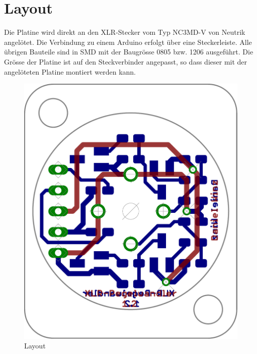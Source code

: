 
\section{Layout}
Die Platine wird direkt an den XLR-Stecker vom Typ NC3MD-V von Neutrik 
angelötet. Die Verbindung zu einem Arduino erfolgt über eine Steckerleiste. 
Alle übrigen Bauteile sind in SMD mit der Baugrösse 0805 bzw. 1206 ausgeführt. 
Die Grösse der Platine ist auf den Steckverbinder angepasst, so dass dieser 
mit der angelöteten Platine montiert werden kann. 
\begin{figure}[h!]
	\centering
	\includegraphics[scale=\layscale]{fig/xlr_pegelwandler_v_1_2_lay_transp.pdf}
	\caption{Layout}
	\label{lay:pegw}
\end{figure}
